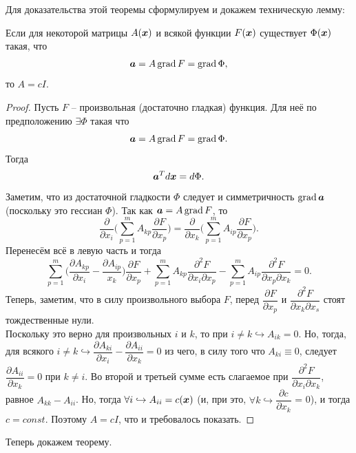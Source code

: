  Для доказательства этой теоремы сформулируем и докажем техническую лемму:
\begin{lemma}
    Если для некоторой матрицы $A(\boldsymbol{x})$ и всякой функции $F(\boldsymbol{x})$ существует $\Phi(\boldsymbol{x})$ такая, что
    \[
        \boldsymbol{a} = A\operatorname{grad} F = \operatorname{grad} \Phi,
    \]
    то $A = cI$.
\end{lemma}
\begin{proof}
    Пусть $F$ -- произвольная (достаточно гладкая) функция.
    Для неё по предположению $\exists \Phi$ такая что
    \[
        \boldsymbol{a} = A \operatorname{grad} F = \operatorname{grad} \Phi.
    \]
    Тогда
    \[
        \boldsymbol{a}^Td\boldsymbol{x} = d\Phi.
    \]
    Заметим, что из достаточной гладкости $\Phi$ следует и симметричность $\operatorname{grad} \boldsymbol{a}$ (поскольку это гессиан $\Phi$).
    Так как $\boldsymbol{a} = A \operatorname{grad} F$, то
    \[
        \dfrac{\partial}{\partial x_i}\biggr( \sum\limits_{p = 1}^m A_{kp} \dfrac{\partial F}{\partial x_p} \biggr) = \dfrac{\partial}{\partial x_k} \biggr(\sum\limits_{p = 1}^m A_{ip}\dfrac{\partial F}{\partial x_p}\biggr).
    \]
    Перенесём всё в левую часть и тогда
    \[
        \sum\limits_{p = 1}^m \biggr(\dfrac{\partial A_{kp}}{\partial x_i} - \dfrac{\partial A_{ip}}{x_k} \biggr) \dfrac{\partial F}{\partial x_p} + \sum\limits_{p = 1}^m A_{kp}\dfrac{\partial^2 F}{\partial x_i \partial x_p} - \sum\limits_{p = 1}^m A_{ip} \dfrac{\partial^2 F}{\partial x_p \partial x_k} = 0.
    \]
    Теперь, заметим, что в силу произвольного выбора $F$, перед $\dfrac{\partial F}{\partial x_p}$ и $\dfrac{\partial^2 F}{\partial x_k \partial x_s}$ стоят тождественные нули. \\
    Поскольку это верно для произвольных $i$ и $k$, то при $i \neq k \hookrightarrow A_{ik} = 0$.
    Но, тогда, для всякого $i \neq k \hookrightarrow \dfrac{\partial A_{ki}}{\partial x_i} - \dfrac{\partial A_{ii}}{\partial x_k} = 0$ из чего, в силу того что $A_{ki} \equiv 0$, следует $\dfrac{\partial A_{ii}}{\partial x_k} = 0$ при $k \neq i$.
    Во второй и третьей сумме есть слагаемое при $\dfrac{\partial^2 F}{\partial x_i \partial x_k}$, равное $A_{kk} - A_{ii}$.
    Но, тогда $\forall i \hookrightarrow A_{ii} = c(\boldsymbol{x})$ (и, при это, $\forall k \hookrightarrow \dfrac{\partial c}{\partial x_k}$ = 0), и тогда $c = const$.
    Поэтому $A = cI$, что и требовалось показать.
\end{proof}
Теперь докажем теорему.
